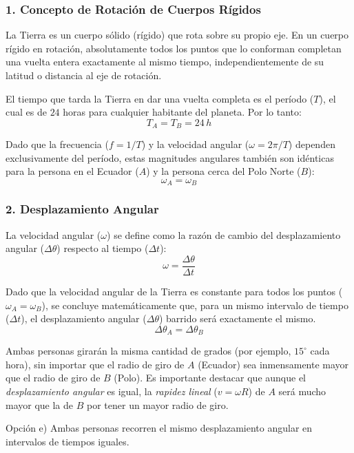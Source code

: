 \documentclass[12pt, a4paper]{article}
\begin{document}
\subsubsection*{1. Concepto de Rotación de Cuerpos Rígidos}
La Tierra es un cuerpo sólido (rígido) que rota sobre su propio eje. En un cuerpo rígido en rotación, absolutamente todos los puntos que lo conforman completan una vuelta entera exactamente al mismo tiempo, independientemente de su latitud o distancia al eje de rotación.

El tiempo que tarda la Tierra en dar una vuelta completa es el período ($T$), el cual es de $24$ horas para cualquier habitante del planeta. Por lo tanto:
$$ T_A = T_B = 24 \, \si{h} $$

Dado que la frecuencia ($f = 1/T$) y la velocidad angular ($\omega = 2\pi/T$) dependen exclusivamente del período, estas magnitudes angulares también son idénticas para la persona en el Ecuador ($A$) y la persona cerca del Polo Norte ($B$):
$$ \omega_A = \omega_B $$

\subsubsection*{2. Desplazamiento Angular}
La velocidad angular ($\omega$) se define como la razón de cambio del desplazamiento angular ($\Delta \theta$) respecto al tiempo ($\Delta t$):
$$ \omega = \frac{\Delta \theta}{\Delta t} $$

Dado que la velocidad angular de la Tierra es constante para todos los puntos ($\omega_A = \omega_B$), se concluye matemáticamente que, para un mismo intervalo de tiempo ($\Delta t$), el desplazamiento angular ($\Delta \theta$) barrido será exactamente el mismo.
$$ \Delta \theta_A = \Delta \theta_B $$

Ambas personas girarán la misma cantidad de grados (por ejemplo, $15^\circ$ cada hora), sin importar que el radio de giro de $A$ (Ecuador) sea inmensamente mayor que el radio de giro de $B$ (Polo). Es importante destacar que aunque el \textit{desplazamiento angular} es igual, la \textit{rapidez lineal} ($v = \omega R$) de $A$ será mucho mayor que la de $B$ por tener un mayor radio de giro.

\begin{tcolorbox}[colback=green!5!white, colframe=green!50!black, title=Respuesta Final]
\centering Opción e) Ambas personas recorren el mismo desplazamiento angular en intervalos de tiempos iguales.
\end{tcolorbox}
\end{document}
